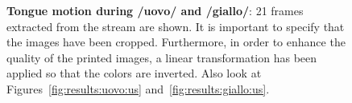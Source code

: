 \begin{figure}
  \centering
	\hspace{0.05\textwidth}

	\caption[Tongue motion during /uovo/ and /giallo/]{\textbf{Tongue motion during 
	/uovo/ and /giallo/}: 21 frames extracted from the  stream are
	shown. It is important to specify that the images have been cropped.
	Furthermore, in order to enhance the quality of the printed images, a linear
	transformation has been applied so that the colors are inverted.
	Also look at Figures~\ref{fig:results:uovo:us}
	and~\ref{fig:results:giallo:us}.}
	\label{fig:results:uss}
\end{figure}
